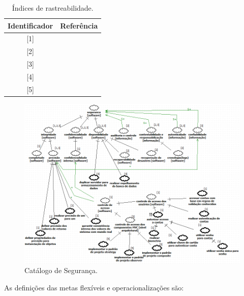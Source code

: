\pagebreak

\begin{table}[h!]
	\centering
	\caption{Índices de rastreabilidade.}
	\label{indicesDeReferencia}
	\begin{tabular}{@{}cc@{}}
		\toprule
		\textbf{Identificador} & \textbf{Referência} \\ \midrule
		{[}1{]} & \cite{chung2012non} \\ 
		{[}2{]} & \cite{benitti2015taxonomia} \\
		{[}3{]} & \cite{documentation2005information} \\
		{[}4{]} & \cite{affleck2012supporting} \\
		{[}5{]} & \cite{buschmann1996system}
		\\ \bottomrule
	\end{tabular}
\end{table} 


\begin{figure}[h!]
	\centering
	\includegraphics[keepaspectratio=true,scale=0.7]{figuras/CatalogoDeSeguranca.PNG}
	\caption{Catálogo de Segurança.}
	\label{DetalhamentoPrimeiroNivel}
\end{figure}


As definições das metas flexíveis e operacionalizações são: 

